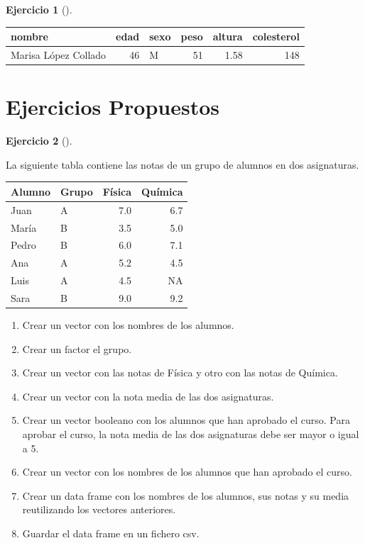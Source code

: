 \documentclass[
  spanish,
  a4paper,
]{scrreport}
\theoremstyle{definition}
\newtheorem{exercise}{Ejercicio}[chapter]
\theoremstyle{remark}
\begin{document}
\begin{exercise}[]
\begin{enumerate}
\begin{tcolorbox}
  \begin{longtable}[]{@{}lrlrrr@{}}
  \toprule\noalign{}
  nombre & edad & sexo & peso & altura & colesterol \\
  \midrule\noalign{}
  \endhead
  \bottomrule\noalign{}
  \endlastfoot
  Marisa López Collado & 46 & M & 51 & 1.58 & 148 \\
  \end{longtable}

  \end{tcolorbox}
\end{enumerate}

\end{exercise}

\section{Ejercicios Propuestos}\label{ejercicios-propuestos}

\begin{exercise}[]\protect\hypertarget{exr-vectores-2}{}\label{exr-vectores-2}

La siguiente tabla contiene las notas de un grupo de alumnos en dos
asignaturas.

\begin{longtable}[]{@{}llrr@{}}
\toprule\noalign{}
Alumno & Grupo & Física & Química \\
\midrule\noalign{}
\endhead
\bottomrule\noalign{}
\endlastfoot
Juan & A & 7.0 & 6.7 \\
María & B & 3.5 & 5.0 \\
Pedro & B & 6.0 & 7.1 \\
Ana & A & 5.2 & 4.5 \\
Luis & A & 4.5 & NA \\
Sara & B & 9.0 & 9.2 \\
\end{longtable}

\begin{enumerate}
\def\labelenumi{\alph{enumi}.}
\item
  Crear un vector con los nombres de los alumnos.
\item
  Crear un factor el grupo.
\item
  Crear un vector con las notas de Física y otro con las notas de
  Química.
\item
  Crear un vector con la nota media de las dos asignaturas.
\item
  Crear un vector booleano con los alumnos que han aprobado el curso.
  Para aprobar el curso, la nota media de las dos asignaturas debe ser
  mayor o igual a 5.
\item
  Crear un vector con los nombres de los alumnos que han aprobado el
  curso.
\item
  Crear un data frame con los nombres de los alumnos, sus notas y su
  media reutilizando los vectores anteriores.
\item
  Guardar el data frame en un fichero csv.
\end{enumerate}

\end{exercise}
\end{document}
